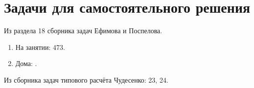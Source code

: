 \section*{Задачи для самостоятельного решения}

Из раздела 18 сборника задач Ефимова и Поспелова.
\begin{enumerate}
    \item На занятии: 473.
    \item Дома: .
\end{enumerate}

Из сборника задач типового расчёта Чудесенко: 23, 24.